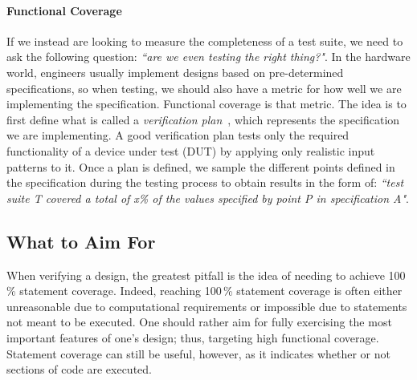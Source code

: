 \documentclass[conference]{IEEEtran}
\newcommand{\hjd}[1]{{\color{pink} Hans: #1}}
\begin{document}
%

\paragraph{Functional Coverage} If we instead are looking to measure the completeness of a test suite, we need to ask the following question: \textit{``are we even testing the right thing?"}. 
In the hardware world, engineers usually implement designs based on pre-determined specifications, so when testing, we should also have a metric for how well we are implementing the specification. 
Functional coverage is that metric. 
The idea is to first define what is called a \textit{verification plan}~\cite{spear2008systemverilog}, which represents the specification we are implementing. 
A good verification plan tests only the required functionality of a device under test (DUT) by applying only 
realistic input patterns to it.
Once a plan is defined, we sample the different points defined in the specification during the testing process to obtain results in the form of: \textit{``test suite T covered a total of x\% of the values specified by point P in specification A"}. 

\subsection{What to Aim For}
When verifying a design, the greatest pitfall is the idea of needing to achieve 100\,\% statement coverage. Indeed, reaching 100\,\% statement coverage is often either unreasonable due to computational requirements or impossible due to statements not meant to be executed. One should rather aim for fully exercising the most important features of one's design; thus, targeting high functional coverage. Statement coverage can still be useful, however, as it indicates whether or not sections of code are executed. 
\end{document}
